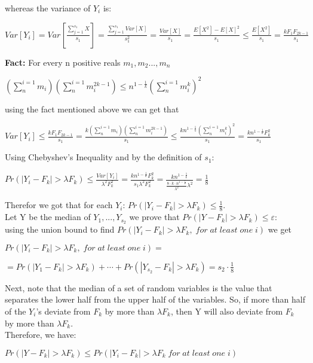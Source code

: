 \documentclass{article}
\begin{document}
whereas the variance of \(Y_i\) is:
\begin{center}
    \(Var[Y_i] = Var[\frac{\sum_{j=1}^{s_1}X}{s_1}] = \frac{\sum_{j=1}^{s_1}Var[X]}{s_1^2} = \frac{Var[X]}{s_1} = \frac{E[X^2]-E[X]^2}{s_1} \leq \frac{E[X^2]}{s_1} = \frac{k F_1 F_{2k-1}}{s_1}\)
\end{center}
\textbf{Fact:} For every n positive reals \(m_1, m_2 ..., m_n\)
\begin{center}
    \((\sum_{n}^{i=1}m_i)(\sum_{n}^{i=1}m_i^{2k-1}) \leq n^{1-\frac{1}{k}}(\sum_{n}^{i=1}m_i^k)^2\)
\end{center}
using the fact mentioned above we can get  that 
\begin{center}
    \(Var[Y_i] \leq
    \frac{k F_1 F_{2k-1}}{s_1} = \frac{k(\sum_{n}^{i=1}m_i)(\sum_{n}^{i=1}m_i^{2k-1})}{s_1} \leq
    \frac{kn^{1-\frac{1}{k}}(\sum_{n}^{i=1}m_i^k)^2}{s_1} = \frac{kn^{1-\frac{1}{k}}F_k^2}{s_1}\)
\end{center}
Using Chebyshev’s Inequality and by the definition of $s_1$:
\begin{center}
    \(Pr(|Y_i - F_k| > \lambda F_k) \leq \frac{Var[Y_i]}{\lambda^2 F_k^2} = \frac{kn^{1-\frac{1}{k}}F_k^2}{s_1 \lambda^2 F_k^2} = 
    \frac{kn^{1-\frac{1}{k}}}{\frac{8\cdot k\cdot n^{1-\frac{1}{k}}}{\lambda^{2}} \lambda^2} = \frac{1}{8}\)
\end{center}
Therefor we got that for each \(Y_i\): \(Pr(|Y_i - F_k| > \lambda F_k) \leq \frac{1}{8}\).\\
Let Y be the median of \(Y_1, ..., Y_{s_2}\) we prove that \(Pr(|Y-F_k|>\lambda F_k) \leq \varepsilon\):\\
using the union bound to find \(Pr(|Y_i - F_k| > \lambda F_k,\; for\; at\; least\; one\; i)\) we get\\
\begin{center}
    \(Pr(|Y_i - F_k| > \lambda F_k,\; for\; at\; least\; one\; i) =\)
    
    \(= Pr(|Y_1 - F_k| > \lambda F_k) +\cdots+ Pr(|Y_{s_2} - F_k| > \lambda F_k) = s_2 \cdot \frac{1}{8}\)
\end{center}
Next, note that the median of a set of random variables is the value that separates the lower half from the upper half of the variables. So, if more than half of the \(Y_i\)'s deviate from \(F_k\) by more than \(\lambda F_k\), then Y will also deviate from \(F_k\) by more than \(\lambda F_k\).\\
Therefore, we have:
\begin{center}
    \(Pr(|Y - F_k| > \lambda F_k) \leq Pr(|Y_i - F_k| > \lambda F_k\; for\; at\; least\; one\; i)\)
\end{center}
\end{document}

